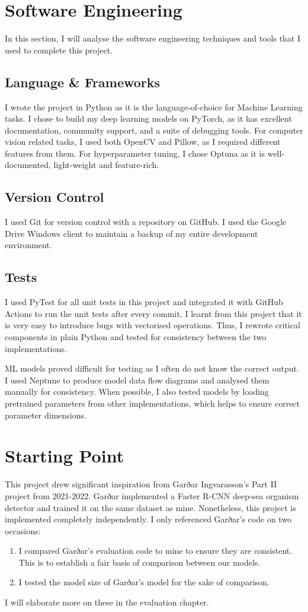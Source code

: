 \documentclass[12pt,a4paper,twoside,openright]{report}
\begin{document}
\section{Software Engineering}
In this section, I will analyse the software engineering techniques and tools that I used to complete this project.

\subsection{Language \& Frameworks}
I wrote the project in Python as it is the language-of-choice for Machine Learning tasks. I chose to build my deep learning models on PyTorch, as it has excellent documentation, community support, and a suite of debugging tools. For computer vision related tasks, I used both OpenCV and Pillow, as I required different features from them. For hyperparameter tuning, I chose Optuna as it is well-documented, light-weight and feature-rich. 

\subsection{Version Control}
I used Git for version control with a repository on GitHub. I used the Google Drive Windows client to maintain a backup of my entire development environment. 

\subsection{Tests}
I used PyTest for all unit tests in this project and integrated it with GitHub Actions to run the unit tests after every commit. I learnt from this project that it is very easy to introduce bugs with vectorised operations. Thus, I rewrote critical components in plain Python and tested for consistency between the two implementations.

ML models proved difficult for testing as I often do not know the correct output. I used Neptune to produce model data flow diagrams and analysed them manually for consistency. When possible, I also tested models by loading pretrained parameters from other implementations, which helps to ensure correct parameter dimensions. 

\section{Starting Point}
This project drew significant inspiration from Garðar Ingvarasson's Part II project from 2021-2022. Garðar implemented a Faster R-CNN deep-sea organism detector and trained it on the same dataset as mine. Nonetheless, this project is implemented completely independently. I only referenced Garðar's code on two occasions:
\begin{enumerate}
    \item I compared Garðar's evaluation code to mine to ensure they are consistent. This is to establish a fair basis of comparison between our models.
    \item I tested the model size of Garðar's model for the sake of comparison.
\end{enumerate}
I will elaborate more on these in the evaluation chapter.
\end{document}
